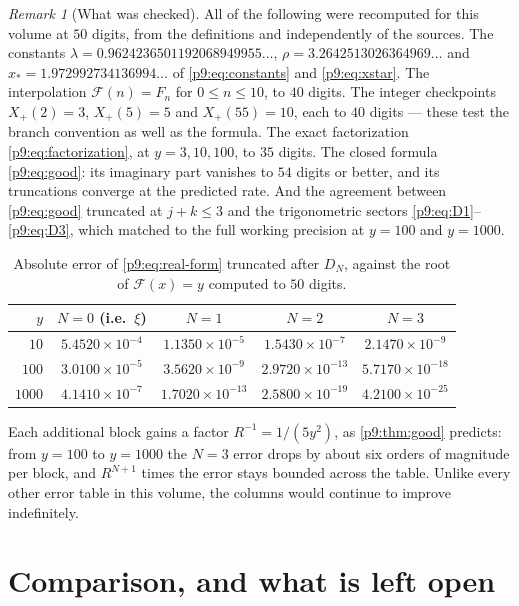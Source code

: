 \documentclass[11pt,a4paper,oneside]{book}
\theoremstyle{plain}
\theoremstyle{definition}
\theoremstyle{remark}
\newtheorem{remark}[theorem]{Remark}
\begin{document}
\begin{remark}[What was checked]\label{p9:rem:verification}
All of the following were recomputed for this volume at $50$ digits, from the
definitions and independently of the sources.  The constants
$\lambda=0.9624236501192068949955\ldots$,
$\rho=3.2642513026364969\ldots$ and
$x_{*}=1.972992734136994\ldots$ of
\eqref{p9:eq:constants} and \eqref{p9:eq:xstar}.  The interpolation
$\mathcal{F}(n)=F_n$ for $0\le n\le10$, to $40$ digits.  The integer
checkpoints $X_+(2)=3$, $X_+(5)=5$ and $X_+(55)=10$, each to $40$ digits ---
these test the branch convention as well as the formula.  The exact
factorization \eqref{p9:eq:factorization}, at $y=3,10,100$, to $35$ digits.
The closed formula \eqref{p9:eq:good}: its imaginary part vanishes to $54$
digits or better, and its truncations converge at the predicted rate.  And the
agreement between \eqref{p9:eq:good} truncated at $j+k\le3$ and the
trigonometric sectors \eqref{p9:eq:D1}--\eqref{p9:eq:D3}, which matched to the
full working precision at $y=100$ and $y=1000$.
\end{remark}

\begin{table}[htbp]
\centering
\caption{Absolute error of \eqref{p9:eq:real-form} truncated after
$D_N$, against the root of $\mathcal{F}(x)=y$ computed to $50$ digits.}
\label{p9:tab:errors}
\small
\begin{tabular}{rcccc}
\toprule
$y$ & $N=0$ (i.e.\ $\xi$) & $N=1$ & $N=2$ & $N=3$\\
\midrule
$10$ & $5.4520\!\times\!10^{-4}$ & $1.1350\!\times\!10^{-5}$
 & $1.5430\!\times\!10^{-7}$ & $2.1470\!\times\!10^{-9}$\\
$100$ & $3.0100\!\times\!10^{-5}$ & $3.5620\!\times\!10^{-9}$
 & $2.9720\!\times\!10^{-13}$ & $5.7170\!\times\!10^{-18}$\\
$1000$ & $4.1410\!\times\!10^{-7}$ & $1.7020\!\times\!10^{-13}$
 & $2.5800\!\times\!10^{-19}$ & $4.2100\!\times\!10^{-25}$\\
\bottomrule
\end{tabular}
\end{table}

Each additional block gains a factor $R^{-1}=1/(5y^{2})$, as
\cref{p9:thm:good} predicts: from $y=100$ to $y=1000$ the $N=3$ error drops by
about six orders of magnitude per block, and $R^{N+1}$ times the error stays
bounded across the table.  Unlike every other error table in this volume, the
columns would continue to improve indefinitely.

\section{Comparison, and what is left open}
\label{p9:sec:open}
\end{document}
